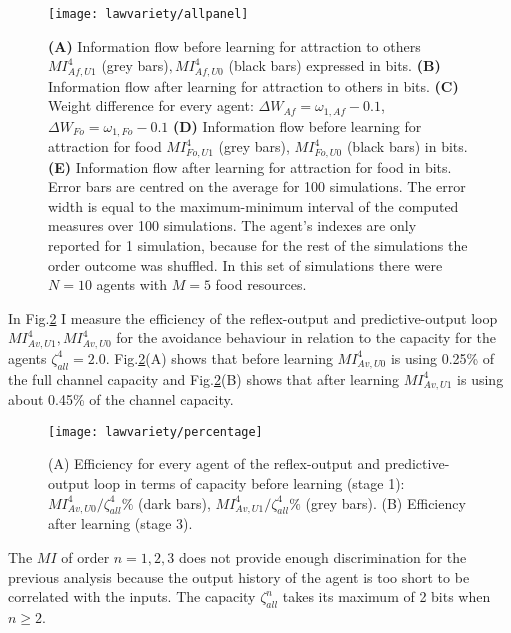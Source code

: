 \begin{figure}
\begin{center}
\texttt{[image: lawvariety/allpanel]}
\begin{small}
\caption[Information flow before and after learning]{
\textbf{(A)} Information flow before learning for attraction to others $MI^4_{Af,U1}$ (grey bars)$,MI^4_{Af,U0}$ (black bars)
expressed in bits.
\textbf{(B)} Information flow after learning for attraction to others in bits.
\textbf{(C)} Weight difference for every agent: $\Delta W_{Af}=\omega_{1,Af}-0.1$, $\Delta W_{Fo}=\omega_{1,Fo}-0.1$
\textbf{(D)} Information flow before learning for attraction for food $MI^4_{Fo,U1}$ (grey bars), $MI^4_{Fo,U0}$ (black bars) in bits.
\textbf{(E)} Information flow after learning for attraction for food in bits. Error bars are centred on the average for 100 simulations.
The error width is equal to the maximum-minimum interval of the computed measures over 100 simulations.
The agent's indexes are only reported for 1 simulation, because for the rest of the simulations the order outcome
was shuffled. In this set of simulations there were $N=10$ agents with $M=5$ food resources.
\label{fig:summary}}
\end{small}
\end{center}
\end{figure}

In Fig.\ref{fig:Cmax} I measure the efficiency of the reflex-output and predictive-output 
loop $MI^4_{Av,U1},MI^4_{Av,U0}$ for the avoidance behaviour in relation to the capacity 
for the agents $\zeta^4_{all}=2.0$. Fig.\ref{fig:Cmax}(A) shows
that before learning $MI^4_{Av,U0}$ is using 0.25\% of the full channel capacity and 
Fig.\ref{fig:Cmax}(B) shows that after learning $MI^4_{Av,U1}$ is using about 0.45\% of the channel capacity.
\begin{figure}
\begin{center}
\texttt{[image: lawvariety/percentage]}
\caption[Information flow and capacity]{
(A) Efficiency for every agent of the reflex-output and predictive-output loop
 in terms of capacity before learning (stage 1):
$MI^4_{Av,U0}/\zeta^4_{all} \%$ (dark bars),
$MI^4_{Av,U1}/\zeta^4_{all}\%$ (grey bars).
(B) Efficiency after learning (stage 3).  \label{fig:Cmax}}
\end{center}
\end{figure}
The $MI$ of order $n=1,2,3$ does not provide enough discrimination for the previous
analysis because the output history of the agent is too short to be correlated with the inputs.
The capacity $\zeta^n_{all}$ takes its maximum of 2 bits when $n \geq 2$.
